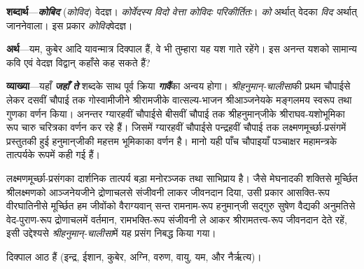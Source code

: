 \parasepone
{}
\begin{sloppypar}\justifying{}
\textbf{शब्दार्थ}—\textbf{\textit{कोबिद}} (\textit{कोविद}) {} वेदज्ञ। \textit{कोर्वेदस्य विदो वेत्ता कोविदः परिकीर्तितः}। \textit{को} अर्थात् वेदका \textit{विद} अर्थात् जाननेवाला। इस प्रकार \textit{कोविद}{}वेदज्ञ।
\end{sloppypar}
\begin{sloppypar}\justifying{}
\textbf{अर्थ}—यम, कुबेर आदि यावन्मात्र दिक्पाल हैं, वे भी तुम्हारा यह यश गाते रहेंगे। इस अनन्त यशको सामान्य कवि एवं वेदज्ञ विद्वान् कहाँसे कह सकते हैं?
\end{sloppypar}
\parasepone
\begin{sloppypar}\justifying{}
\textbf{व्याख्या}—यहाँ \textbf{\textit{जहाँ ते}} शब्दके साथ पूर्व क्रिया \textbf{\textit{गावैं}}का अन्वय होगा। \textit{श्रीहनुमान्‌-चालीसा}की प्रथम चौपाईसे लेकर दसवीं चौपाई तक गोस्वामीजीने श्रीरामजीके वात्सल्य-भाजन श्रीआञ्जनेयके मङ्गलमय स्वरूप तथा गुणका वर्णन किया। अनन्तर ग्यारहवीं चौपाईसे बीसवीं चौपाई तक श्रीहनुमान्‌जीके श्रीराघव-यशोभूमिका रूप चारु चरित्रका वर्णन कर रहे हैं। जिसमें ग्यारहवीं चौपाईसे पन्द्रहवीं चौपाई तक लक्ष्मणमूर्च्छा-प्रसंगमें प्रस्तुतकी हुई हनुमान्‌जीकी महत्तम भूमिकाका वर्णन है। मानो यही पाँच चौपाइयाँ पञ्चाक्षर महामन्त्रके तात्पर्यके रूपमें कही गई हैं।
\end{sloppypar}
\begin{sloppypar}\justifying{}
लक्ष्मणमूर्च्छा-प्रसंगका दार्शनिक तात्पर्य बड़ा मनोरञ्जक तथा साभिप्राय है। जैसे मेघनादकी शक्तिसे मूर्च्छित श्रीलक्ष्मणको आञ्जनेयजीने द्रोणाचलसे संजीवनी लाकर जीवनदान दिया, उसी प्रकार आसक्ति-रूप वीरघातिनीसे मूर्च्छित हम जीवोंको वैराग्यवान् सन्त रामनाम-रूप हनुमान्‌जी सद्गुरु सुषेण वैद्यकी अनुमतिसे वेद-पुराण-रूप द्रोणाचलमें वर्तमान, रामभक्ति-रूप संजीवनी ले आकर श्रीरामतत्त्व-रूप जीवनदान देते रहें, इसी उद्देश्यसे \textit{श्रीहनुमान्‌-चालीसा}में यह प्रसंग निबद्ध किया गया।
\end{sloppypar}
\begin{sloppypar}\justifying{}
दिक्पाल आठ हैं (इन्द्र, ईशान, कुबेर, अग्नि, वरुण, वायु, यम, और नैर्ऋत्य)।
\end{sloppypar}
\paraseplotus
\pagebreak


